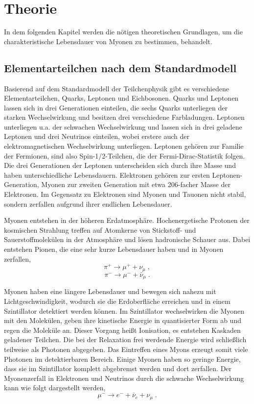 \section{Theorie}

In dem folgenden Kapitel werden die nötigen theoretischen Grundlagen, um die charakteristische Lebensdauer von Myonen zu bestimmen, behandelt.

\subsection{Elementarteilchen nach dem Standardmodell}

Basierend auf dem Standardmodell der Teilchenphysik gibt es verschiedene Elementarteilchen, Quarks, Leptonen und Eichbosonen. Quarks und Leptonen lassen sich in drei Generationen einteilen, die sechs Quarks unterliegen der starken Wechselwirkung und besitzen drei verschiedene Farbladungen. Leptonen unterliegen u.a. der schwachen Wechselwirkung und lassen sich in drei geladene Leptonen und drei Neutrinos einteilen, wobei erstere auch der elektromagnetischen Wechselwirkung unterliegen. Leptonen gehören zur Familie der Fermionen, sind also Spin-1/2-Teilchen, die der Fermi-Dirac-Statistik folgen. Die drei Generationen der Leptonen unterscheiden sich durch ihre Masse und haben unterschiedliche Lebensdauern. Elektronen gehören zur ersten Leptonen-Generation, Myonen zur zweiten Generation mit etwa 206-facher Masse der Elektronen. Im Gegensatz zu Elektronen sind Myonen und Tauonen nicht stabil, sondern zerfallen aufgrund ihrer endlichen Lebensdauer.

Myonen entstehen in der höheren Erdatmosphäre. Hochenergetische Protonen der kosmischen Strahlung treffen auf Atomkerne von Stickstoff- und Sauerstoffmolekülen in der Atmosphäre und lösen hadronische Schauer aus. Dabei entstehen Pionen, die eine sehr kurze Lebensdauer haben und in Myonen zerfallen, $$\pi^+ \rightarrow \mu^+ + \nu_\mu\; ,$$ $$\pi^- \rightarrow \mu^- + \bar{\nu}_\mu\; .$$

Myonen haben eine längere Lebensdauer und bewegen sich nahezu mit Lichtgeschwindigkeit, wodurch sie die Erdoberfläche erreichen und in einem Szintillator detektiert werden können. Im Szintillator wechselwirken die Myonen mit den Molekülen, geben ihre kinetische Energie in quantisierter Form ab und regen die Moleküle an. Dieser Vorgang heißt Ionisation, es entstehen Kaskaden geladener Teilchen. Die bei der Relaxation frei werdende Energie wird schließlich teilweise als Photonen abgegeben. Das Eintreffen eines Myons erzeugt somit viele Photonen im detektierbaren Bereich. Einige Myonen haben so geringe Energie, dass sie im Szintillator komplett abgebremst werden und dort zerfallen. Der Myonenzerfall in Elektronen und Neutrinos durch die schwache Wechselwirkung kann wie folgt dargestellt werden, $$\mu^- \rightarrow e^- + \bar{\nu}_e + \nu_\mu\; . $$

